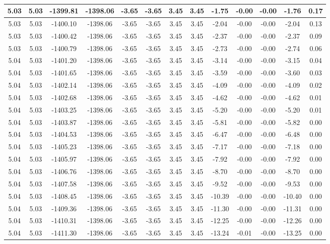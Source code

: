 \begin{table}[htbp]
\begin{adjustbox}{angle=90}
\begin{tabular}{|c|c|c|c|c|c|c|c|c|c|c|c|c|}
 5.03 & 5.03 & -1399.81 & -1398.06 & -3.65 & -3.65 & 3.45 & 3.45 & -1.75 & -0.00 & -0.00 & -1.76 & 0.17\\ \hline
 5.03 & 5.03 & -1400.10 & -1398.06 & -3.65 & -3.65 & 3.45 & 3.45 & -2.04 & -0.00 & -0.00 & -2.04 & 0.13\\ \hline
 5.03 & 5.03 & -1400.42 & -1398.06 & -3.65 & -3.65 & 3.45 & 3.45 & -2.37 & -0.00 & -0.00 & -2.37 & 0.09\\ \hline
 5.03 & 5.03 & -1400.79 & -1398.06 & -3.65 & -3.65 & 3.45 & 3.45 & -2.73 & -0.00 & -0.00 & -2.74 & 0.06\\ \hline
 5.04 & 5.03 & -1401.20 & -1398.06 & -3.65 & -3.65 & 3.45 & 3.45 & -3.14 & -0.00 & -0.00 & -3.15 & 0.04\\ \hline
 5.04 & 5.03 & -1401.65 & -1398.06 & -3.65 & -3.65 & 3.45 & 3.45 & -3.59 & -0.00 & -0.00 & -3.60 & 0.03\\ \hline
 5.04 & 5.03 & -1402.14 & -1398.06 & -3.65 & -3.65 & 3.45 & 3.45 & -4.09 & -0.00 & -0.00 & -4.09 & 0.02\\ \hline
 5.04 & 5.03 & -1402.68 & -1398.06 & -3.65 & -3.65 & 3.45 & 3.45 & -4.62 & -0.00 & -0.00 & -4.62 & 0.01\\ \hline
 5.04 & 5.03 & -1403.25 & -1398.06 & -3.65 & -3.65 & 3.45 & 3.45 & -5.20 & -0.00 & -0.00 & -5.20 & 0.01\\ \hline
 5.04 & 5.03 & -1403.87 & -1398.06 & -3.65 & -3.65 & 3.45 & 3.45 & -5.81 & -0.00 & -0.00 & -5.82 & 0.00\\ \hline
 5.04 & 5.03 & -1404.53 & -1398.06 & -3.65 & -3.65 & 3.45 & 3.45 & -6.47 & -0.00 & -0.00 & -6.48 & 0.00\\ \hline
 5.04 & 5.03 & -1405.23 & -1398.06 & -3.65 & -3.65 & 3.45 & 3.45 & -7.17 & -0.00 & -0.00 & -7.18 & 0.00\\ \hline
 5.04 & 5.03 & -1405.97 & -1398.06 & -3.65 & -3.65 & 3.45 & 3.45 & -7.92 & -0.00 & -0.00 & -7.92 & 0.00\\ \hline
 5.04 & 5.03 & -1406.76 & -1398.06 & -3.65 & -3.65 & 3.45 & 3.45 & -8.70 & -0.00 & -0.00 & -8.70 & 0.00\\ \hline
 5.04 & 5.03 & -1407.58 & -1398.06 & -3.65 & -3.65 & 3.45 & 3.45 & -9.52 & -0.00 & -0.00 & -9.53 & 0.00\\ \hline
 5.04 & 5.03 & -1408.45 & -1398.06 & -3.65 & -3.65 & 3.45 & 3.45 & -10.39 & -0.00 & -0.00 & -10.40 & 0.00\\ \hline
 5.04 & 5.03 & -1409.36 & -1398.06 & -3.65 & -3.65 & 3.45 & 3.45 & -11.30 & -0.00 & -0.00 & -11.31 & 0.00\\ \hline
 5.04 & 5.03 & -1410.31 & -1398.06 & -3.65 & -3.65 & 3.45 & 3.45 & -12.25 & -0.00 & -0.00 & -12.26 & 0.00\\ \hline
 5.04 & 5.03 & -1411.30 & -1398.06 & -3.65 & -3.65 & 3.45 & 3.45 & -13.24 & -0.01 & -0.00 & -13.25 & 0.00\\ \hline
            \end{tabular}
        \end{adjustbox}
        \caption{}
        \label{}
    \end{table}
    